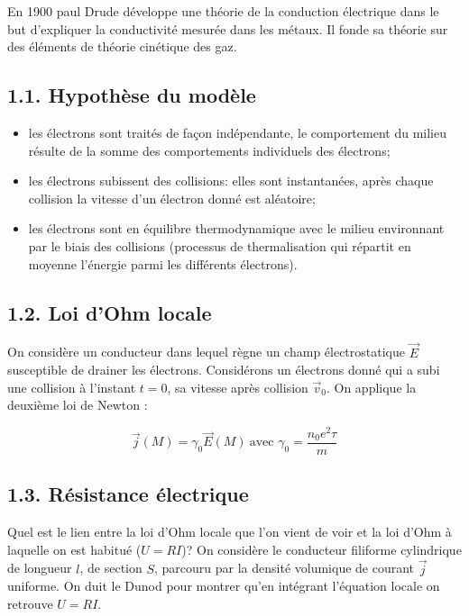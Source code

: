 \documentclass[french, a4paper, 10pt, twocolumn, landscape]{article}
\begin{document}
En 1900 paul Drude développe une théorie de la conduction électrique dans le but d'expliquer la conductivité mesurée dans les métaux. Il fonde sa théorie sur des éléments de théorie cinétique des gaz.

\subsection*{1.1. Hypothèse du modèle}

\begin{itemize}
    \item les électrons sont traités de façon indépendante, le comportement du milieu résulte de la somme des comportements individuels des électrons;
    \item les électrons subissent des collisions: elles sont instantanées, après chaque collision la vitesse d'un électron donné est aléatoire;
    \item les électrons sont en équilibre thermodynamique avec le milieu environnant par le biais des collisions (processus de thermalisation qui répartit en moyenne l'énergie parmi les différents électrons).
\end{itemize}

\subsection*{1.2. Loi d'Ohm locale}
On considère un conducteur dans lequel règne un champ électrostatique $\vec{E}$ susceptible de drainer les électrons. Considérons un électrons donné qui a subi une collision à l'instant $t=0$, sa vitesse après collision $\vec{v}_0$. On applique la deuxième loi de Newton : 

\begin{equation}
    \vec{j}(M)=\gamma_0\vec{E}(M)~\text{avec } \gamma_0=\dfrac{n_0e^2\tau}{m}
\end{equation}

\subsection*{1.3. Résistance électrique}

Quel est le lien entre la loi d'Ohm locale que l'on vient de voir et la loi d'Ohm à laquelle on est habitué ($U=RI$)? On considère le conducteur filiforme cylindrique de longueur $l$, de section $S$, parcouru par la densité volumique de courant $\vec{j}$ uniforme. On duit le Dunod pour montrer qu'en intégrant l'équation locale on retrouve $U=RI$.
\end{document}
